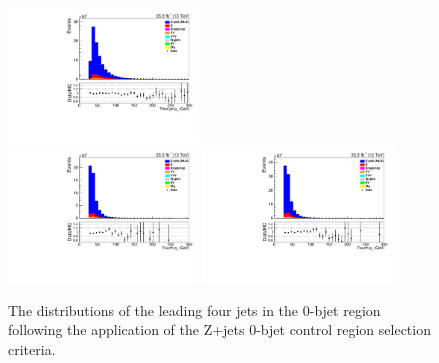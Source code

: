 \begin{figure}[!ht]
\includegraphics[width=0.45\textwidth]{figs/background-estimation/plots/unblinded/DY_control_old_prompt_mumu_DYamcatnlo/thirdJetPt_SingleTop_jetSel_mumu.pdf}
\\
\includegraphics[width=0.45\textwidth]{figs/background-estimation/plots/unblinded/DY_control_old_prompt_ee_DYamcatnlo/fourthJetPt_SingleTop_jetSel_ee.pdf}
\includegraphics[width=0.45\textwidth]{figs/background-estimation/plots/unblinded/DY_control_old_prompt_mumu_DYamcatnlo/fourthJetPt_SingleTop_jetSel_mumu.pdf}
\caption{
The distributions of the leading four jets \pt in the 0-bjet region following the application of the Z+jets 0-bjet control region selection criteria.
}
\label{fig:App_CR_NLO_jetPt_jetSel}
\end{figure}

